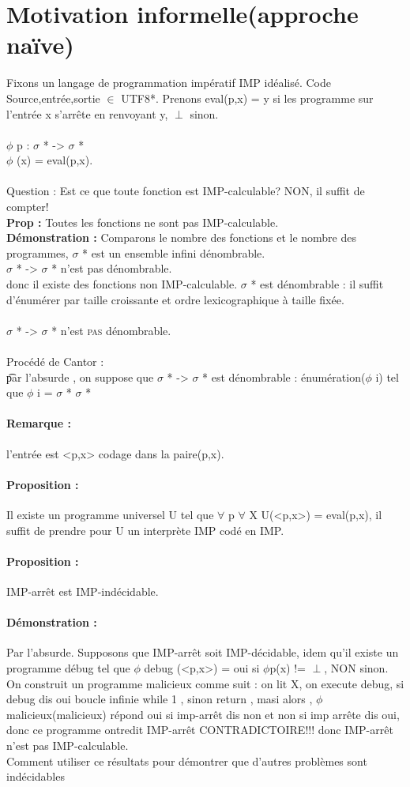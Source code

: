 \documentclass{article}
\begin{document}
\section{Motivation informelle(approche naïve)}Fixons un langage de programmation impératif IMP idéalisé. Code Source,entrée,sortie $\in$ UTF8*. Prenons eval(p,x) = y si les programme sur l'entrée x s'arrête en renvoyant y, $\perp$ sinon.\\\\$\phi$ p : $\sigma$ * -> $\sigma$ *\\$\phi$ (x) = eval(p,x).\\\\Question : Est ce que toute fonction est IMP-calculable? NON, il suffit de compter!\\\textbf{Prop : }Toutes les fonctions ne sont pas IMP-calculable.\\\textbf{Démonstration : }Comparons le nombre des fonctions et le nombre des programmes, $\sigma$ * est un ensemble infini dénombrable.\\$\sigma$ * -> $\sigma$ * n'est pas dénombrable.\\donc il existe des fonctions non IMP-calculable. $\sigma$ *  est dénombrable : il suffit d'énumérer par taille croissante et ordre lexicographique à taille fixée.\\\\$\sigma$ * -> $\sigma$ * n'est  \textsc{pas} dénombrable.\\\\Procédé de Cantor : \\\t par l'absurde , on suppose que $\sigma$ * -> $\sigma$ * est dénombrable : énumération($\phi$ i) tel que { $\phi$ i} = $\sigma$ * $\sigma$ * 
\paragraph{Remarque : }l'entrée est <p,x> codage dans la paire(p,x).
\paragraph{Proposition : }Il existe un programme universel U tel que $\forall$ p $\forall$ X U(<p,x>) = eval(p,x), il suffit de prendre pour U un interprète IMP codé en IMP.
\paragraph{Proposition  : }IMP-arrêt est IMP-indécidable.
\paragraph{Démonstration : }Par l'absurde. Supposons que IMP-arrêt soit IMP-décidable, idem qu'il existe un programme débug tel que $\phi$ debug (<p,x>) = {oui si $\phi$p(x) != $\perp$, NON sinon}.\\On construit un programme malicieux comme suit :  on lit X, on execute debug, si debug dis oui boucle infinie while 1 , sinon return , masi alors , $\phi$ malicieux(malicieux) répond oui si imp-arrêt dis non et non si imp arrête dis oui, donc ce programme ontredit IMP-arrêt CONTRADICTOIRE!!! donc IMP-arrêt n'est pas IMP-calculable.\\Comment utiliser ce résultats pour démontrer que d'autres problèmes sont indécidables
\end{document}
